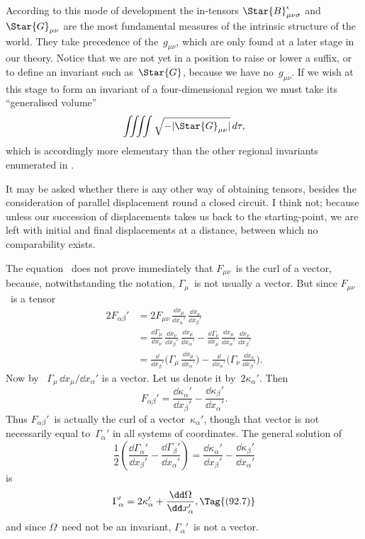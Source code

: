 \documentclass[12pt]{book}
\begin{document}
According to this mode of development the in\hyp{}tensors $\Star{B}_{\mu\nu\sigma}^{\epsilon}$ and~$\Star{G}_{\mu\nu}$ are
%
the most fundamental measures of the intrinsic structure of the world. They
take precedence of the~$g_{\mu\nu}$, which are only found at a later stage in our theory.
Notice that we are not yet in a position to raise or lower a suffix, or to define
an invariant such as~$\Star{G}$, because we have no~$g_{\mu\nu}$. If we wish at this stage to
form an invariant of a four\hyp{}dimensional region we must take its ``generalised
volume''
\[
\iiiint \sqrt{-|\Star{G}_{\mu\nu}|}\, d\tau,
\]
which is accordingly more elementary than the other regional invariants
enumerated in .

It may be asked whether there is any other way of obtaining tensors,
besides the consideration of parallel displacement round a closed circuit. I
think not; because unless our succession of displacements takes us back to the
starting\hyp{}point, we are left with initial and final displacements at a distance,
between which no comparability exists.

The equation~ does not prove immediately that $F_{\mu\nu}$~is the curl of a
vector, because, notwithstanding the notation, $\Gamma_{\mu}$~is not usually a vector. But
since $F_{\mu\nu}$~is a tensor
\begin{align*}
  2F_{\alpha\beta}'
  &= 2F_{\mu\nu}\, \frac{\dd x_{\mu}}{\dd x_{\alpha}'}\, \frac{\dd x_{\nu}}{\dd x_{\beta}'} \\
  &= \frac{\dd\Gamma_{\mu}}{\dd x_{\nu}}\, \frac{\dd x_{\nu}}{\dd x_{\beta}'}\, \frac{\dd x_{\mu}}{\dd x_{\alpha}'}
  - \frac{\dd\Gamma_{\nu}}{\dd x_{\mu}}\, \frac{\dd x_{\mu}}{\dd x_{\alpha}'}\, \frac{\dd x_{\nu}}{\dd x_{\beta}'} \\
  &= \frac{\dd}{\dd x_{\beta}'} \biggl(\Gamma_{\mu}\, \frac{\dd x_{\mu}}{\dd x_{\alpha}'}\biggr)
  - \frac{\dd}{\dd x_{\alpha}'} \biggl(\Gamma_{\nu}\, \frac{\dd x_{\nu}}{\dd x_{\beta}'}\biggr).
\end{align*}
Now by~ $\Gamma_{\mu}\, \dd x_{\mu}/\dd x_{\alpha}'$ is a vector. Let us denote it by~$2\kappa_{\alpha}'$. Then
\[
F_{\alpha\beta}'
= \frac{\dd\kappa_{\alpha}'}{\dd x_{\beta}'} - \frac{\dd\kappa_{\beta}'}{\dd x_{\alpha}'}.
\]
Thus $F_{\alpha\beta}'$~is actually the curl of a vector~$\kappa_{\alpha}'$, though that vector is not necessarily
equal to~$\Gamma_{\alpha}'$ in all systems of coordinates. The general solution of
\[
\frac{1}{2} \left(\frac{\dd\Gamma_{\alpha}'}{\dd x_{\beta}'} - \frac{\dd\Gamma_{\beta}'}{\dd x_{\alpha}'}\right)
= \frac{\dd\kappa_{\alpha}'}{\dd x_{\beta}'} - \frac{\dd\kappa_{\beta}'}{\dd x_{\alpha}'}
\]
is
\[
\Gamma_{\alpha}' = 2\kappa_{\alpha}' + \frac{\dd\Omega}{\dd x_{\alpha}'},
\Tag{(92.7)}
\]
and since $\Omega$~need not be an invariant, $\Gamma_{\alpha}'$~is not a vector.
\end{document}

